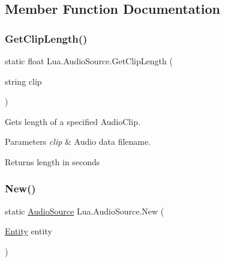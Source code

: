 \subsection{Member Function Documentation}
\mbox{\label{class_lua_1_1_audio_source_a7d14ab87ad493f85fa9ee1b747bf6df0}} 
\subsubsection{\texorpdfstring{GetClipLength()}{GetClipLength()}}
{\footnotesize\ttfamily static float Lua.\+Audio\+Source.\+Get\+Clip\+Length (\begin{DoxyParamCaption}\item[{string}]{clip }\end{DoxyParamCaption})\hspace{0.3cm}{\ttfamily [static]}}



Gets length of a specified Audio\+Clip. 


\begin{DoxyParams}{Parameters}
{\em clip} & Audio data filename.\\
\hline
\end{DoxyParams}
\begin{DoxyReturn}{Returns}
length in seconds
\end{DoxyReturn}
\mbox{\label{class_lua_1_1_audio_source_a9960981498216301c82794fa6a14d7ac}} 
\subsubsection{\texorpdfstring{New()}{New()}\hspace{0.1cm}{\footnotesize\ttfamily [1/2]}}
{\footnotesize\ttfamily static \mbox{\hyperlink{class_lua_1_1_audio_source}{Audio\+Source}} Lua.\+Audio\+Source.\+New (\begin{DoxyParamCaption}\item[{\mbox{\hyperlink{class_lua_1_1_entity}{Entity}}}]{entity }\end{DoxyParamCaption})\hspace{0.3cm}{\ttfamily [static]}}



